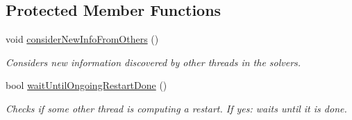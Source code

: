 \subsection*{Protected Member Functions}
\begin{DoxyCompactItemize}
\item 
void \hyperlink{classClauseExplorerSAT_aca3490db608f1c3a4a832e67654dd246}{consider\-New\-Info\-From\-Others} ()
\begin{DoxyCompactList}\small\item\em Considers new information discovered by other threads in the solvers. \end{DoxyCompactList}\item 
bool \hyperlink{classClauseExplorerSAT_a0515689c4464599e0d2d3c350d710d75}{wait\-Until\-Ongoing\-Restart\-Done} ()
\begin{DoxyCompactList}\small\item\em Checks if some other thread is computing a restart. If yes\-: waits until it is done. \end{DoxyCompactList}\end{DoxyCompactItemize}

